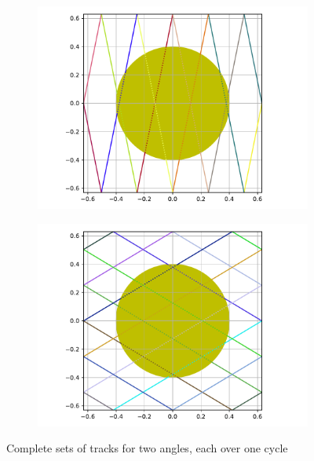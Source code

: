 \documentclass[12pt]{article}
\begin{document}
   \begin{figure}[H]
        \centering
        \begin{subfigure}[b]{0.45\textwidth}
            \centering
            \includegraphics[width=\textwidth]{figs/Ang3.pdf}
        \end{subfigure}
        \quad
        \begin{subfigure}[b]{0.45\textwidth}  
            \centering 
            \includegraphics[width=\textwidth]{figs/Ang1.pdf}
        \end{subfigure}
        \caption{Complete sets of tracks for two angles, each over one cycle}
        \label{fig:twocycles}
    \end{figure}
    
\end{document}
